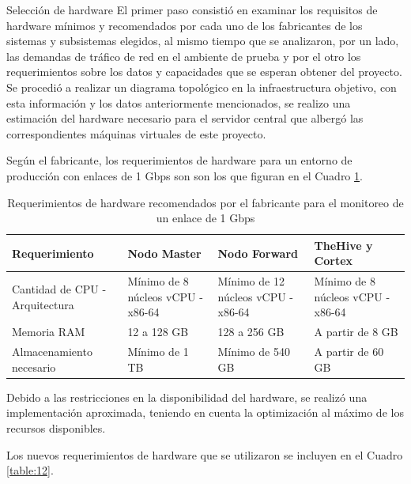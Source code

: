     \begin{section}{Selección de hardware} %
        El primer paso consistió en examinar los requisitos de hardware mínimos y recomendados por cada uno de los fabricantes de los sistemas y subsistemas elegidos, al mismo tiempo que se analizaron, por un lado, las demandas de tráfico de red en el ambiente de prueba y por el otro los requerimientos sobre los datos y capacidades que se esperan obtener del proyecto. Se procedió a realizar un diagrama topológico en la infraestructura objetivo, con esta información y los datos anteriormente mencionados, se realizo una estimación del hardware necesario para el servidor central que albergó las correspondientes máquinas virtuales de este proyecto.\par
        Según el fabricante, los requerimientos de hardware para un entorno de producción con enlaces de 1 Gbps son son los que figuran en el Cuadro \ref{table:5}.
        
        \begin{table}[H]
        \centering
        \begin{tabular}{|m{9em}|m{9em}|m{9em}|m{9em}|}
        
            \hline 
                Requerimiento  & Nodo Master &  Nodo Forward & TheHive y Cortex \\ 
            \hline
                Cantidad de CPU - Arquitectura & Mínimo de 8 núcleos vCPU - x86-64 & Mínimo de 12 núcleos vCPU - x86-64 & Mínimo de 8 núcleos vCPU - x86-64 \\ 
            \hline
                Memoria RAM  & 12 a 128 GB & 128 a 256 GB & A partir de 8 GB \\ 
            \hline
                Almacenamiento necesario & Mínimo de 1 TB  & Mínimo de 540 GB & A partir de 60 GB \\
            \hline %
        \end{tabular}
        \caption{Requerimientos de hardware recomendados por el fabricante para el monitoreo de un enlace de 1 Gbps}
        \label{table:5}
        \end{table}
        
        Debido a las restricciones en la disponibilidad del hardware, se realizó una implementación aproximada, teniendo en cuenta la optimización al máximo de los recursos disponibles. \par
	    Los nuevos requerimientos de hardware que se utilizaron se incluyen en el Cuadro \ref{table:12}.


\end{section}
